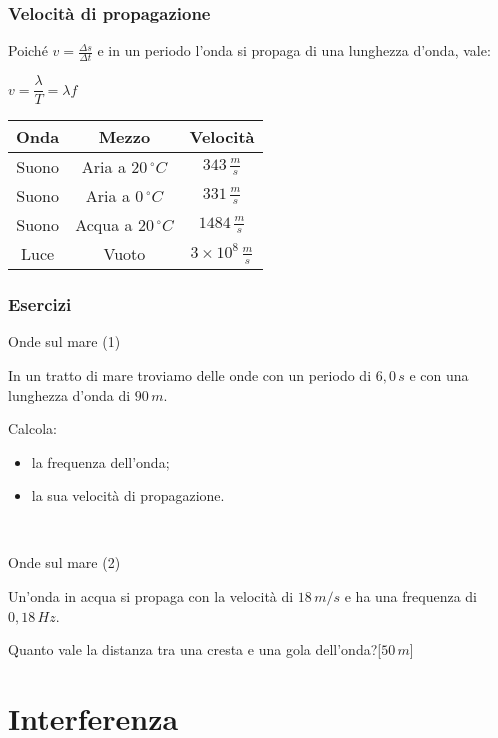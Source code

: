 \documentclass[]{beamer}
\theoremstyle{plain}
\begin{document}
\begin{frame}
  \frametitle{Velocità di propagazione}
  Poiché $ v = \frac{\Delta s}{\Delta t} $ e in un periodo l'onda si propaga di una lunghezza d'onda, vale:
  \begin{center}
  \colorbox{marroncino!30}{$ v = \dfrac{\lambda}{T} = \lambda f $}
  \end{center}\pause
  
  \centering
  \begin{tabular}{c|c|c}
    \textbf{Onda} & \textbf{Mezzo} & \textbf{Velocità} \\\hline\rule{0pt}{3ex}
    Suono & Aria a $ 20 \,{}^\circ C$ & $ 343 \, \frac{m}{s} $ \\\rule{0pt}{3ex}
    Suono & Aria a $ 0\,{}^\circ C $ & $ 331 \, \frac{m}{s} $ \\\rule{0pt}{3ex}
    Suono & Acqua a $ 20\,{}^\circ C $ & $ 1484 \, \frac{m}{s} $ \\\rule{0pt}{3ex}
    Luce & Vuoto & $ 3 \times 10^8 \, \frac{m}{s} $\\
  \end{tabular}
\end{frame}


\begin{frame}
\frametitle{Esercizi}
\begin{exampleblock}{Onde sul mare (1)}
  \small{In un tratto di mare troviamo delle onde con un periodo di $ 6,0 \, s $ e con una lunghezza d'onda di $ 90 \, m $.

  Calcola:
  \begin{itemize}
    \item la frequenza dell'onda;
    \item la sua velocità di propagazione.
  \end{itemize}  }
\end{exampleblock}

~

\begin{exampleblock}{Onde sul mare (2)}
  \small{Un'onda in acqua si propaga con la velocità di $ 18 \, m/s $ e ha una frequenza di $ 0,18 \, Hz $.
  
  Quanto vale la distanza tra una cresta e una gola dell'onda?\hspace*{\fill}[$ 50 \, m $]}
\end{exampleblock}
\end{frame}



\section{Interferenza}
\end{document}
